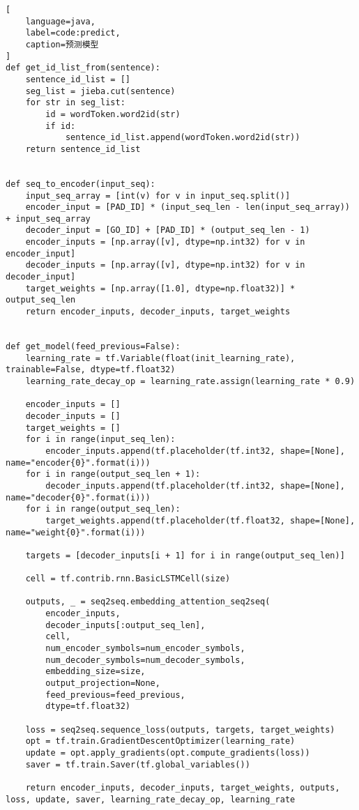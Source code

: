 \begin{appendices}
\begin{lstlisting}[
    language=java,
    label=code:predict,
    caption=预测模型
]
def get_id_list_from(sentence):
    sentence_id_list = []
    seg_list = jieba.cut(sentence)
    for str in seg_list:
        id = wordToken.word2id(str)
        if id:
            sentence_id_list.append(wordToken.word2id(str))
    return sentence_id_list


def seq_to_encoder(input_seq):
    input_seq_array = [int(v) for v in input_seq.split()]
    encoder_input = [PAD_ID] * (input_seq_len - len(input_seq_array)) + input_seq_array
    decoder_input = [GO_ID] + [PAD_ID] * (output_seq_len - 1)
    encoder_inputs = [np.array([v], dtype=np.int32) for v in encoder_input]
    decoder_inputs = [np.array([v], dtype=np.int32) for v in decoder_input]
    target_weights = [np.array([1.0], dtype=np.float32)] * output_seq_len
    return encoder_inputs, decoder_inputs, target_weights


def get_model(feed_previous=False):
    learning_rate = tf.Variable(float(init_learning_rate), trainable=False, dtype=tf.float32)
    learning_rate_decay_op = learning_rate.assign(learning_rate * 0.9)

    encoder_inputs = []
    decoder_inputs = []
    target_weights = []
    for i in range(input_seq_len):
        encoder_inputs.append(tf.placeholder(tf.int32, shape=[None], name="encoder{0}".format(i)))
    for i in range(output_seq_len + 1):
        decoder_inputs.append(tf.placeholder(tf.int32, shape=[None], name="decoder{0}".format(i)))
    for i in range(output_seq_len):
        target_weights.append(tf.placeholder(tf.float32, shape=[None], name="weight{0}".format(i)))

    targets = [decoder_inputs[i + 1] for i in range(output_seq_len)]

    cell = tf.contrib.rnn.BasicLSTMCell(size)

    outputs, _ = seq2seq.embedding_attention_seq2seq(
        encoder_inputs,
        decoder_inputs[:output_seq_len],
        cell,
        num_encoder_symbols=num_encoder_symbols,
        num_decoder_symbols=num_decoder_symbols,
        embedding_size=size,
        output_projection=None,
        feed_previous=feed_previous,
        dtype=tf.float32)

    loss = seq2seq.sequence_loss(outputs, targets, target_weights)
    opt = tf.train.GradientDescentOptimizer(learning_rate)
    update = opt.apply_gradients(opt.compute_gradients(loss))
    saver = tf.train.Saver(tf.global_variables())

    return encoder_inputs, decoder_inputs, target_weights, outputs, loss, update, saver, learning_rate_decay_op, learning_rate



\end{lstlisting}
\end{appendices}
